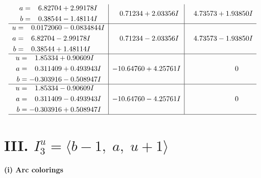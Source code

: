 \documentclass[1p]{elsarticle_modified}
\theoremstyle{definition}
\begin{document}
$$\begin{array}{c|c|c}
\begin{aligned}
a &= \phantom{-}6.82704 + 2.99178 I \\
b &= \phantom{-}0.38544 - 1.48114 I\end{aligned}
 & \phantom{-}0.71234 + 2.03356 I & \phantom{-}4.73573 + 1.93850 I \\ \hline\begin{aligned}
u &= \phantom{-}0.0172060 - 0.0834844 I \\
a &= \phantom{-}6.82704 - 2.99178 I \\
b &= \phantom{-}0.38544 + 1.48114 I\end{aligned}
 & \phantom{-}0.71234 - 2.03356 I & \phantom{-}4.73573 - 1.93850 I \\ \hline\begin{aligned}
u &= \phantom{-}1.85334 + 0.90609 I \\
a &= \phantom{-}0.311409 + 0.493943 I \\
b &= -0.303916 - 0.508947 I\end{aligned}
 & -10.64760 + 4.25761 I & \phantom{-0.000000 } 0 \\ \hline\begin{aligned}
u &= \phantom{-}1.85334 - 0.90609 I \\
a &= \phantom{-}0.311409 - 0.493943 I \\
b &= -0.303916 + 0.508947 I\end{aligned}
 & -10.64760 - 4.25761 I & \phantom{-0.000000 } 0\\
 \hline 
 \end{array}$$\newpage\newpage\renewcommand{\arraystretch}{1}
\centering \section*{III. $I^u_{3}= \langle b-1,\;a,\;u+1 \rangle$}
\flushleft \textbf{(i) Arc colorings}\\
\end{document}

